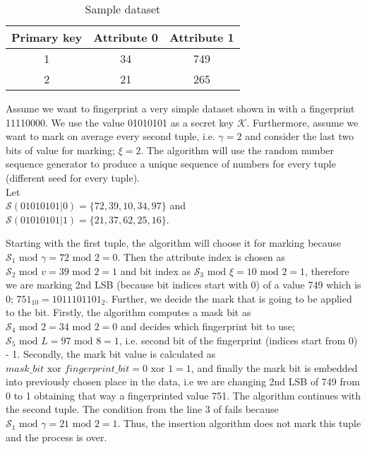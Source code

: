 \begin{table}[ht]
    \centering
    \caption{Sample dataset}
    \label{tab:exemplary_dataset}
    \begin{tabular}{|c|c|c|}
        \hline
         Primary key & Attribute 0 & Attribute 1  \\
         \hline
         1 & 34 & 749 \\
         \hline
         2 & 21 & 265 \\
         \hline
    \end{tabular}
\end{table}
Assume we want to fingerprint a very simple dataset shown in  with a fingerprint 11110000.
We use the value 01010101 as a secret key $\mathcal{K}$. 
Furthermore, assume we want to mark on average every second tuple, i.e. $\gamma=2$ and consider the last two bits of value for marking; $\xi=2$.
The algorithm will use the random number sequence generator to produce a unique sequence of numbers for every tuple (different seed for every tuple).
\\Let \\
\hspace*{10 mm} $\mathcal{S}(01010101 | 0) = \{72,39,10,34,97\}$ and \\
\hspace*{10 mm} $\mathcal{S}(01010101 | 1) = \{21,37,62,25,16\}$.

Starting with the first tuple, the algorithm will choose it for marking because $\mathcal{S}_1 \text{ mod } \gamma = 72 \text{ mod } 2 = 0$.
Then the attribute index is chosen as $\mathcal{S}_2 \text{ mod } v = 39 \text{ mod } 2 = 1$ and bit index as $\mathcal{S}_3 \text{ mod } \xi = 10 \text{ mod } 2 = 1$, therefore we are marking 2nd LSB (because bit indices start with 0) of a value 749 which is 0; $751_{10} = 1011101101_2$.
Further, we decide the mark that is going to be applied to the bit. Firstly, the algorithm computes a mask bit as $\mathcal{S}_4 \text{ mod } 2 = 34 \text{ mod } 2 = 0$ and decides which fingerprint bit to use; $\mathcal{S}_5 \text{ mod } L = 97 \text{ mod } 8 = 1$, i.e. second bit of the fingerprint (indices start from 0) - 1.
Secondly, the mark bit value is calculated as $mask\_bit \text{ xor } fingerprint\_bit = 0 \text{ xor } 1 = 1$, and finally the mark bit is embedded into previously chosen place in the data, i.e we are changing 2nd LSB of 749 from 0 to 1 obtaining that way a fingerprinted value 751. 
The algorithm continues with the second tuple. The condition from the line 3 of  fails because $\mathcal{S}_1 \text{ mod } \gamma = 21 \text{ mod } 2 = 1$. Thus, the insertion algorithm does not mark this tuple and the process is over. 

